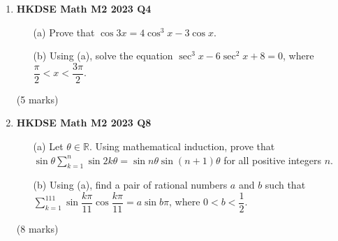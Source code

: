 \documentclass{report}
\begin{document}
\begin{enumerate}
	\item \textbf{HKDSE Math M2 2023 Q4}
	\begin{enumerate}
		\item[(a)]Prove that $\cos{3x} = 4\cos^3{x} - 3\cos{x}$.
		\item[(b)]Using (a), solve the equation $\sec^3{x} - 6\sec^2{x} + 8 = 0$, where $\dfrac{\pi}{2} < x < \dfrac{3\pi}{2}$.
	\end{enumerate}
	(5 marks)

	\item \textbf{HKDSE Math M2 2023 Q8}
	\begin{enumerate}
		\item [(a)]Let $\theta \in \mathbb{R}$. Using mathematical induction, prove that $\displaystyle \sin{\theta}\sum_{k=1}^{n}\sin{2k\theta} = \sin{n\theta}\sin{(n+1)\theta}$ for all positive integers $n$.
		\item [(b)] Using (a), find a pair of rational numbers $a$ and $b$ such that $\displaystyle\sum_{k = 1}^{111}\sin{\dfrac{k\pi}{11}}\cos{\dfrac{k\pi}{11}} = a\sin{b\pi}$, where $0 < b < \dfrac{1}{2}$.
	\end{enumerate}
	(8 marks)

\end{enumerate}
\end{document}
